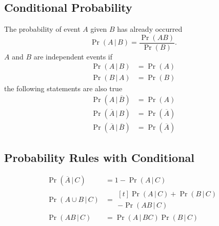 \documentclass{article}
\begin{document}
\begin{multicols}{3}
    \subsection{Conditional Probability}
    The probability of event \(A\) given \(B\) has already occurred
    \begin{equation*}
        \Pr{\left( A \,\vert\, B \right)} = \frac{\Pr{\left( A B \right)}}{\Pr{\left( B \right)}}.
    \end{equation*}
    \(A\) and \(B\) are independent events if
    \begin{align*}
        \Pr{\left( A \,\vert\, B \right)} & = \Pr{\left( A \right)} \\
        \Pr{\left( B \,\vert\, A \right)} & = \Pr{\left( B \right)}
    \end{align*}
    the following statements are also true
    \begin{align*}
        \Pr{\left( A \,\vert\, \overline{B} \right)}            & = \Pr{\left( A \right)}            \\
        \Pr{\left( \overline{A} \,\vert\, B \right)}            & = \Pr{\left( \overline{A} \right)} \\
        \Pr{\left( \overline{A} \,\vert\, \overline{B} \right)} & = \Pr{\left( \overline{A} \right)}
    \end{align*}
    \subsection{Probability Rules with Conditional}
    \begin{align*}
        \Pr{\left( \overline{A} \,\vert\, C \right)} & = 1 - \Pr{\left( A \,\vert\, C \right)}                                 \\
        \Pr{\left( A \cup B \,\vert\, C \right)}     & = \begin{aligned}[t]
                                                             \Pr{\left( A \,\vert\, C \right)} + \Pr{\left( B \,\vert\, C \right)} \\
                                                             - \Pr{\left( AB \,\vert\, C \right)}
                                                         \end{aligned} \\
        \Pr{\left( A B \,\vert\, C \right)}          & = \Pr{\left( A \,\vert\, BC \right)} \Pr{\left( B \,\vert\, C \right)}
    \end{align*}

\end{multicols}
\end{document}
